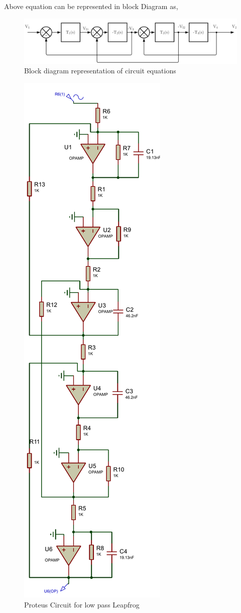 \documentclass[a4paper,11pt]{article}
\begin{document}
Above equation can be represented in block Diagram as,
\begin{figure}[H]
    \centering
    \includegraphics[width=\linewidth]{./FIG/Block rep.jpg}
    \caption{Block diagram representation of circuit equations}
\end{figure}


\begin{figure}[H] %
    \centering
    \includegraphics[width=0.39\linewidth]{./FIG/P_cir_figlow pass leapfrog.PDF}
    \caption{Proteus Circuit for low pass Leapfrog}
\end{figure}
\end{document}
